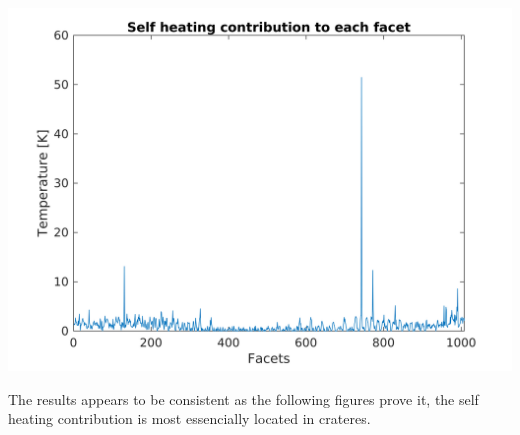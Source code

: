 \begin{center}
    \includegraphics[width=\linewidth]{rsc/self_contribution.png}
    \label{fig:5.4}
\end{center}
The results appears to be consistent as the following figures prove it, the self heating contribution is most essencially located in crateres.
